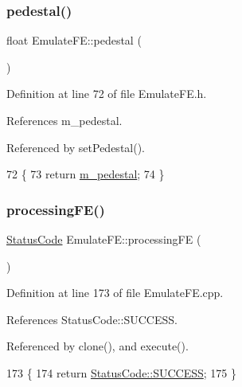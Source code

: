 \subsubsection{\texorpdfstring{pedestal()}{pedestal()}}
{\footnotesize\ttfamily float Emulate\+F\+E\+::pedestal (\begin{DoxyParamCaption}{ }\end{DoxyParamCaption})\hspace{0.3cm}{\ttfamily [inline]}}



Definition at line 72 of file Emulate\+F\+E.\+h.



References m\+\_\+pedestal.



Referenced by set\+Pedestal().


\begin{DoxyCode}
72                   \{
73     \textcolor{keywordflow}{return} \hyperlink{classEmulateFE_a033996ce759c11305395ac865a6c074a}{m\_pedestal};
74   \}
\end{DoxyCode}
\mbox{\label{classEmulateFE_adf7213a308c8a04f4d7efbb86a13689e}} 
\subsubsection{\texorpdfstring{processing\+F\+E()}{processingFE()}}
{\footnotesize\ttfamily \hyperlink{classStatusCode}{Status\+Code} Emulate\+F\+E\+::processing\+FE (\begin{DoxyParamCaption}{ }\end{DoxyParamCaption})\hspace{0.3cm}{\ttfamily [protected]}}



Definition at line 173 of file Emulate\+F\+E.\+cpp.



References Status\+Code\+::\+S\+U\+C\+C\+E\+SS.



Referenced by clone(), and execute().


\begin{DoxyCode}
173                                     \{
174   \textcolor{keywordflow}{return} \hyperlink{classStatusCode_a6f565cbeadc76d14c72f047e5e85eb4badd0da38d3ba0d922efd1f4619bc37ad8}{StatusCode::SUCCESS};
175 \}
\end{DoxyCode}
\mbox{\label{classEmulateFE_a33403f61dc51ffc30c008cf5782636b1}} 

